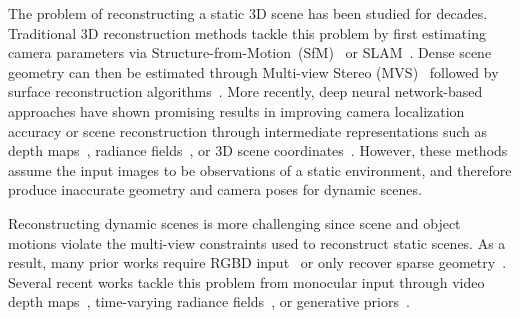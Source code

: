 The problem of reconstructing a static 3D scene has been studied for decades. Traditional 3D reconstruction methods tackle this problem by first estimating camera parameters via Structure-from-Motion~(SfM)~\cite{snavely2006photo, pollefeys2008detailed, pollefeys2004visual,pollefeys2008detailed, agarwal2011building, schonberger2016structure, sweeney2019structure, holynski2020reducing} or SLAM~\cite{engel2017direct, campos2021orb, mur2015orb, davison2007monoslam}. 
Dense scene geometry can then be estimated through Multi-view Stereo (MVS)~\cite{campbell2008using, jancosek2011multi, furukawa2010towards, furukawa2009accurate, galliani2015massively, schonberger2016pixelwise, yao2018mvsnet, yao2019recurrent} followed by surface reconstruction algorithms~\cite{hoppe1992surface, curless1996volumetric, kazhdan2006poisson}. More recently, deep neural network-based approaches have shown promising results in improving camera localization accuracy or scene reconstruction through intermediate representations such as depth maps~\cite{bloesch2018codeslam, tang2018ba, teed2024deep, teed2021droid, shen2023dytanvo, li2024megasam}, radiance fields~\cite{lin2021barf, Fu_2024_CVPR, park2023camp, gao2024cat3d, shih2024extranerf, weber2024nerfiller}, or 3D scene coordinates~\cite{brachmann2023ace, brachmann2024acezero, leroy2024grounding, wang2024dust3r, zhang2024monst3r}. However, these methods assume the input images to be observations of a static environment, and therefore produce inaccurate geometry and camera poses for dynamic scenes.

Reconstructing dynamic scenes is more challenging since scene and object motions violate the multi-view constraints used to reconstruct static scenes. As a result, many prior works require RGBD input~\cite{bozic2020deepdeform,  newcombe2015dynamicfusion} or only recover sparse geometry~\cite{park20103d, vo2016spatiotemporal, simon2016kronecker}. Several recent works tackle this problem from monocular input through video depth maps~\cite{zhang2021consistent, kopf2021rcvd, zhang2022structure}, time-varying radiance fields~\cite{park2021nerfies,park2021hypernerf,li2021neural, liu2023robust, li2023dynibar, gao2022monocular, lei2024mosca, wang2024shape}, or generative priors~\cite{wu2024cat4d}.

